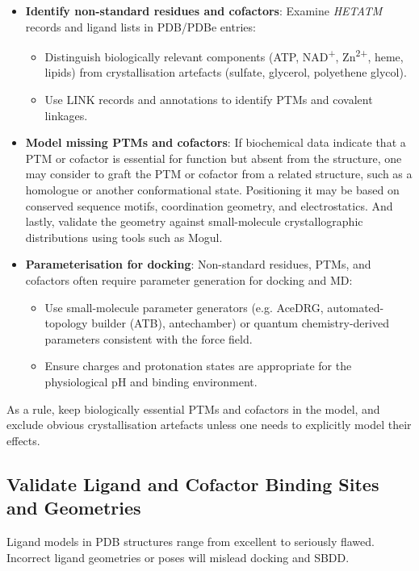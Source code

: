 \documentclass[12pt]{article}
\begin{document}
\begin{itemize}
  \item \textbf{Identify non-standard residues and cofactors}: Examine \emph{HETATM} records and ligand lists in PDB/PDBe entries:
\begin{itemize}
  \item Distinguish biologically relevant components (ATP, NAD\textsuperscript{+}, Zn\textsuperscript{2+}, heme, lipids) from crystallisation artefacts (sulfate, glycerol, polyethene glycol).
  \item Use LINK records and annotations to identify PTMs and covalent linkages.
\end{itemize}

  \item \textbf{Model missing PTMs and cofactors}: If biochemical data indicate that a PTM or cofactor is essential for function but absent from the structure, one may consider to graft the PTM or cofactor from a related structure, such as a homologue or another conformational state. Positioning it may be based on conserved sequence motifs, coordination geometry, and electrostatics. And lastly, validate the geometry against small-molecule crystallographic distributions using tools such as Mogul\cite{CH4_bruno2004retrieval,CH4_nicholls2017ligand}.

  \item \textbf{Parameterisation for docking}: Non-standard residues, PTMs, and cofactors often require parameter generation for docking and MD:
\begin{itemize}
  \item Use small-molecule parameter generators (e.g. AceDRG\cite{CH4_long2017}, automated-topology builder (ATB)\cite{CH4_stroet2018}, antechamber\cite{CH4_wang2001}) or quantum chemistry-derived parameters consistent with the force field.\cite{CH4_nicholls2017ligand,CH4_bruno2004retrieval}
  \item Ensure charges and protonation states are appropriate for the physiological pH and binding environment.
\end{itemize}
\end{itemize}
As a rule, keep biologically essential PTMs and cofactors in the model, and exclude obvious crystallisation artefacts unless one needs to explicitly model their effects.

\subsection{Validate Ligand and Cofactor Binding Sites and Geometries}
Ligand models in PDB structures range from excellent to seriously flawed. Incorrect ligand geometries or poses will mislead docking and SBDD.\cite{CH4_chakraborti2021all,CH4_emsley2017tools}
\end{document}
